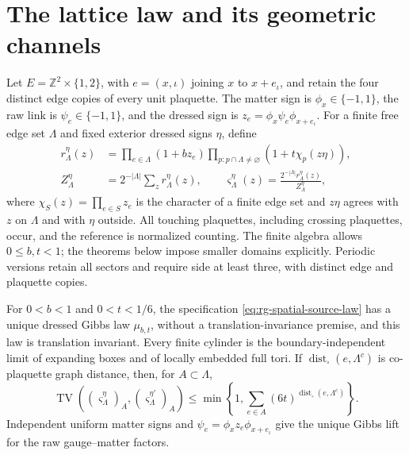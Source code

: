 \section{The lattice law and its geometric channels}
\label{sec:rg-spatial-source}

Let \(E=\mathbb Z^2\times\{1,2\}\), with \(e=(x,\iota)\) joining \(x\) to
\(x+e_\iota\), and retain the four distinct edge copies of every unit
plaquette. The matter sign is \(\phi_x\in\{-1,1\}\), the raw link is
\(\psi_e\in\{-1,1\}\), and the dressed sign is
\(z_e=\phi_x\psi_e\phi_{x+e_\iota}\). For a finite free edge set
\(\Lambda\) and fixed exterior dressed signs \(\eta\), define
\begin{equation}
 \begin{aligned}
 r_\Lambda^\eta(z)&=\prod_{e\in\Lambda}(1+bz_e)
 \prod_{p:p\cap\Lambda\ne\varnothing}(1+t\chi_p(z\eta)),\\
 Z_\Lambda^\eta&=2^{-|\Lambda|}\sum_zr_\Lambda^\eta(z),\qquad
 \varsigma_\Lambda^\eta(z)=\frac{2^{-|\Lambda|}r_\Lambda^\eta(z)}{Z_\Lambda^\eta},
 \end{aligned}
 \label{eq:rg-spatial-source-law}
\end{equation}
where \(\chi_S(z)=\prod_{e\in S}z_e\) is the character of a finite edge
set and \(z\eta\) agrees with \(z\) on \(\Lambda\) and with \(\eta\)
outside. All touching plaquettes, including crossing plaquettes, occur, and
the reference is normalized counting. The finite algebra allows
\(0\le b,t<1\); the theorems below impose smaller domains explicitly.
Periodic versions retain all sectors and require side at least three, with
distinct edge and plaquette copies.

For \(0<b<1\) and \(0<t<1/6\), the specification
\cref{eq:rg-spatial-source-law} has a unique dressed Gibbs law
\(\mu_{b,t}\), without a translation-invariance premise, and this law is
translation invariant. Every finite cylinder is the boundary-independent
limit of expanding boxes and of locally embedded full tori. If
\(\operatorname{dist}_\square(e,\Lambda^c)\) is co-plaquette graph distance, then, for
\(A\subset\Lambda\),
\begin{equation}
 \operatorname{TV}((\varsigma_\Lambda^\eta)_A,(\varsigma_\Lambda^{\eta'})_A)
 \le\min\left\{1,\sum_{e\in A}(6t)^{\operatorname{dist}_\square(e,\Lambda^c)}\right\}.
 \label{eq:rg-spatial-boundary-comparison}
\end{equation}
Independent uniform matter signs and \(\psi_e=\phi_xz_e\phi_{x+e_\iota}\)
give the unique Gibbs lift for the raw gauge--matter factors.

